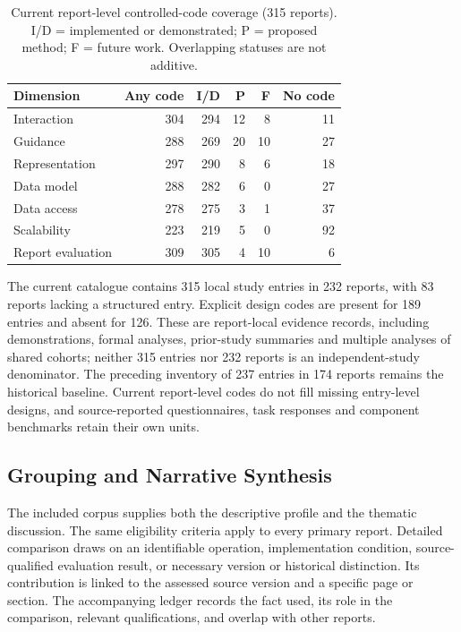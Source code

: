 \documentclass[manuscript,review,screen]{acmart}
\begin{document}
\begin{table}[htbp]
\centering\small
\caption{Current report-level controlled-code coverage (315 reports). I/D = implemented or demonstrated; P = proposed method; F = future work. Overlapping statuses are not additive.}
\label{tab:current-code-profile}
\begin{tabular}{@{}lrrrrr@{}}
\toprule Dimension & Any code & I/D & P & F & No code\\\midrule
Interaction & 304 & 294 & 12 & 8 & 11\\
Guidance & 288 & 269 & 20 & 10 & 27\\
Representation & 297 & 290 & 8 & 6 & 18\\
Data model & 288 & 282 & 6 & 0 & 27\\
Data access & 278 & 275 & 3 & 1 & 37\\
Scalability & 223 & 219 & 5 & 0 & 92\\
Report evaluation & 309 & 305 & 4 & 10 & 6\\
\bottomrule\end{tabular}
\end{table}

The current catalogue contains 315 local study entries in 232 reports, with 83 reports lacking a structured entry. Explicit design codes are present for 189 entries and absent for 126. These are report-local evidence records, including demonstrations, formal analyses, prior-study summaries and multiple analyses of shared cohorts; neither 315 entries nor 232 reports is an independent-study denominator. The preceding inventory of 237 entries in 174 reports remains the historical baseline. Current report-level codes do not fill missing entry-level designs, and source-reported questionnaires, task responses and component benchmarks retain their own units.

\subsection{Grouping and Narrative Synthesis}
The included corpus supplies both the descriptive profile and the thematic discussion. The same eligibility criteria apply to every primary report. Detailed comparison draws on an identifiable operation, implementation condition, source-qualified evaluation result, or necessary version or historical distinction. Its contribution is linked to the assessed source version and a specific page or section. The accompanying ledger records the fact used, its role in the comparison, relevant qualifications, and overlap with other reports.
\end{document}
